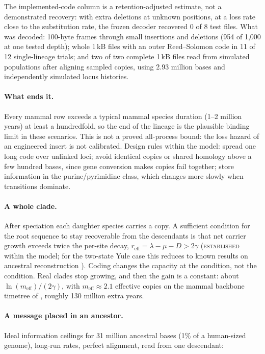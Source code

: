 \documentclass[11pt]{article}
\begin{document}
The implemented-code column is a retention-adjusted estimate, not a demonstrated recovery: with extra deletions at unknown positions, at a loss rate close to the substitution rate, the frozen decoder recovered 0 of 8 test files. What was decoded: 100-byte frames through small insertions and deletions (954 of 1{,}000 at one tested depth); whole 1\,kB files with an outer Reed--Solomon code in 11 of 12 single-lineage trials; and two of two complete 1\,kB files read from simulated populations after aligning sampled copies, using 2.93 million bases and independently simulated locus histories.

\paragraph{What ends it.} Every mammal row exceeds a typical mammal species duration (1--2 million years) at least a hundredfold, so the end of the lineage is the plausible binding limit in these scenarios. This is not a proved all-process bound: the loss hazard of an engineered insert is not calibrated. Design rules within the model: spread one long code over unlinked loci; avoid identical copies or shared homology above a few hundred bases, since gene conversion makes copies fail together; store information in the purine/pyrimidine class, which changes more slowly when transitions dominate.

\paragraph{A whole clade.} After speciation each daughter species carries a copy. A sufficient condition for the root sequence to stay recoverable from the descendants is that net carrier growth exceeds twice the per-site decay, $r_{\mathrm{eff}} = \lambda-\mu-D > 2\gamma$ (\textsc{established} within the model; for the two-state Yule case this reduces to known results on ancestral reconstruction \cite{gascuelsteel,mosselslysohn}). Coding changes the capacity at the condition, not the condition. Real clades stop growing, and then the gain is a constant: about $\ln(m_{\mathrm{eff}})/(2\gamma)$, with $m_{\mathrm{eff}}\approx 2.1$ effective copies on the mammal backbone timetree of \cite{upham2019}, roughly 130 million extra years.

\paragraph{A message placed in an ancestor.} Ideal information ceilings for 31 million ancestral bases (1\% of a human-sized genome), long-run rates, perfect alignment, read from one descendant:
\end{document}
